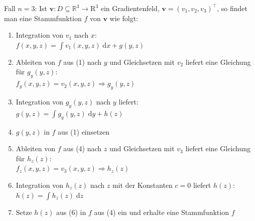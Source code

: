 \documentclass[6pt,a4paper]{scrartcl}
\renewcommand{\vec}[1]{\ensuremath{\boldsymbol {#1}}}                                           %
\newcommand{\diff}{\ensuremath{\;\mathrm d}}                                   %
\begin{document}
\begin{multicols*}{4}

    Fall $n=3$: Ist $\vec v:D\subseteq \mathbb{R}^3\rightarrow\mathrm{R}^3$ ein Gradientenfeld, $\vec v=(v_1,v_2,v_3)^\top$, so findet man eine Stammfunktion $f$ von $\vec v$ wie folgt:
    \begin{enumerate}
        \item Integration von $v_1$ nach $x$:\\
              $f(x,y,z)=\int {v_1(x,y,z)\diff x} + g(y,z)$
        \item Ableiten von $f$ aus (1) nach $y$ und Gleichsetzen mit $v_2$ liefert eine Gleichung für $g_y(y,z)$:\\
              $f_y(x,y,z)=v_2(x,y,z) \Rightarrow g_y(y,z)$
        \item Integration von $g_y(y,z)$ nach $y$ liefert:\\
              $g(y,z) = \int{g_y(y,z)\diff y} + h(z)$
        \item $g(y,z)$ in $f$ aus (1) einsetzen
        \item Ableiten von $f$ aus (4) nach $z$ und Gleichsetzen mit $v_3$ liefert eine Gleichung für $h_z(z)$:\\
              $f_z(x,y,z)=v_3(x,y,z) \Rightarrow h_z(z)$
        \item Integration von $h_z(z)$ nach $z$ mit der Konstanten $c=0$ liefert $h(z)$: \\
              $h(z)=\int{h_z(z)\diff z}$
        \item Setze $h(z)$ aus (6) in $f$ aus (4) ein und erhalte eine Stammfunktion $f$
    \end{enumerate}


\end{multicols*}
\end{document}
